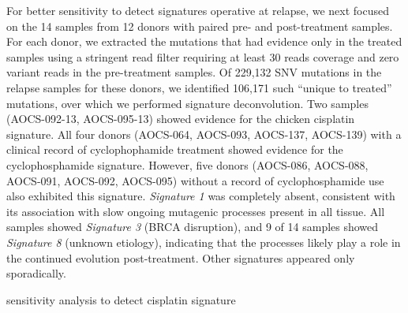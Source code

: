 For better sensitivity to detect signatures operative at relapse, we next focused on the 14 samples from 12 donors with paired pre- and post-treatment samples. For each donor, we extracted the mutations that had evidence only in the treated samples using a stringent read filter requiring at least 30 reads coverage and zero variant reads in the pre-treatment samples. Of 229,132 SNV mutations in the relapse samples for these donors, we identified 106,171 such ``unique to treated'' mutations, over which we performed signature deconvolution. Two samples (AOCS-092-13, AOCS-095-13) showed evidence for the chicken cisplatin signature. All four donors (AOCS-064, AOCS-093, AOCS-137, AOCS-139) with a clinical record of cyclophophamide treatment showed evidence for the cyclophosphamide signature. However, five donors (AOCS-086, AOCS-088, AOCS-091, AOCS-092, AOCS-095) without a record of cyclophosphamide use also exhibited this signature. \textit{Signature 1} was completely absent, consistent with its association with slow ongoing mutagenic processes present in all tissue. All samples showed \textit{Signature 3} (BRCA disruption), and 9 of 14 samples showed \textit{Signature 8} (unknown etiology), indicating that the processes likely play a role in the continued evolution post-treatment. Other signatures appeared only sporadically.

sensitivity analysis to detect cisplatin signature


